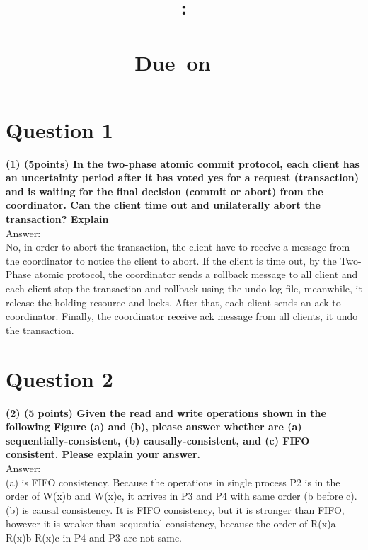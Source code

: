 \documentclass{article}
\title{
    \vspace{2in}
    \textmd{\textbf{\hmwkClass:\\\ \hmwkTitle}}\\
    \normalsize\vspace{0.1in}\small{Due\ on\ \hmwkDueDate\ }\\
    \vspace{0.1in}\large{\textit{\hmwkClassInstructor}}
    \vspace{3in}
}
\author{\textbf{\hmwkAuthorName}}
\date{}
\begin{document}
\maketitle
\newpage
\tableofcontents
\newpage

\section{Question 1}
\textbf{(1)	(5points) In the two-phase atomic commit protocol, each client has an uncertainty period after it has voted yes for a request (transaction) and is waiting for the final decision (commit or abort) from the coordinator. Can the client time out and unilaterally abort the transaction? Explain}\\

Answer:\\

No, in order to abort the transaction, the client have to receive a message from the coordinator to notice the client to abort. If the client is time out, by the Two-Phase atomic protocol, the coordinator sends a rollback message to all client and each client stop the transaction and rollback using the undo log file, meanwhile, it release the holding resource and locks. After that, each client sends an ack to coordinator. Finally, the coordinator receive ack message from all clients, it undo the transaction.\\

\clearpage
\section{Question 2}
\textbf{(2)	(5 points) Given the read and write operations shown in the following Figure (a) and (b), please answer whether are (a) sequentially-consistent, (b) causally-consistent, and (c) FIFO consistent. Please explain your answer.}\\

Answer:\\

(a) is FIFO consistency.  Because the operations in single process P2 is in the order of W(x)b and W(x)c, it arrives in P3 and P4 with same order (b before c).\\

(b) is causal consistency. It is FIFO consistency, but it is stronger than FIFO, however it is weaker than sequential consistency, because the order of R(x)a R(x)b R(x)c in P4 and P3 are not same.\\
\end{document}
